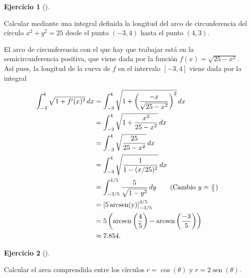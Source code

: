 \documentclass[
  spanish,
  a4paper,
]{scrreport}
\theoremstyle{definition}
\newtheorem{exercise}{Ejercicio}[chapter]
\theoremstyle{remark}
\begin{document}
\begin{exercise}[]\protect\hypertarget{exr-3}{}\label{exr-3}

Calcular mediante una integral definida la longitud del arco de
circunferencia del círculo \(x^2+y^2=25\) desde el punto \((-3,4)\)
hasta el punto \((4,3)\).

\end{exercise}

\begin{tcolorbox}[enhanced jigsaw, arc=.35mm, bottomrule=.15mm, bottomtitle=1mm, breakable, colback=white, colbacktitle=quarto-callout-tip-color!10!white, colframe=quarto-callout-tip-color-frame, coltitle=black, left=2mm, leftrule=.75mm, opacityback=0, opacitybacktitle=0.6, rightrule=.15mm, title=\textcolor{quarto-callout-tip-color}{\faLightbulb}\hspace{0.5em}{Solución}, titlerule=0mm, toprule=.15mm, toptitle=1mm]

El arco de circunferencia con el que hay que trabajar está en la
semicircunferencia positiva, que viene dada por la función
\(f(x) = \sqrt{25-x^2}\). Así pues, la longitud de la curva de \(f\) en
el intervalo \([-3,4]\) viene dada por la integral

\begin{align*}
\int_{-3}^4 \sqrt{1 + f'(x)^2}\, dx &=
\int_{-3}^4 \sqrt{1 + \left(\frac{-x}{\sqrt{25-x^2}}\right)^2}\, dx \\
&= \int_{-3}^4 \sqrt{1 + \frac{x^2}{25-x^2}}\, dx \\
&= \int_{-3}^4 \sqrt{\frac{25}{25-x^2}}\, dx \\
&= \int_{-3}^4 \sqrt{\frac{1}{1-(x/25)^2}}\, dx \\
&= \int_{-3/5}^{4/5} \frac{5}{\sqrt{1-y^2}}\, dy \tag{Cambio $y=\frac{x}{5}$}\\
&= [5\operatorname{arcsen(y)}]_{-3/5}^{4/5} \\
&= 5\left(\operatorname{arcsen}\left(\frac{4}{5}\right) - \operatorname{arcsen}\left(\frac{-3}{5}\right)\right) \\
&\approx 7.854.
\end{align*}

\end{tcolorbox}

\begin{exercise}[]\protect\hypertarget{exr-4}{}\label{exr-4}

Calcular el area comprendida entre los círculos \(r=\cos(\theta)\) y
\(r=2\operatorname{sen}(\theta)\).

\end{exercise}
\end{document}
